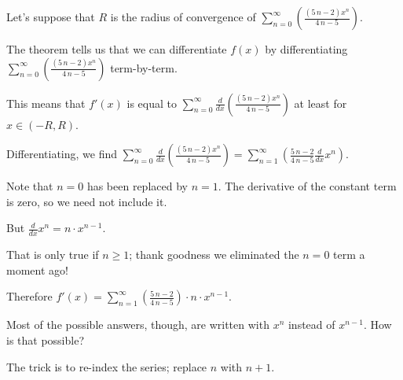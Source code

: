 \documentclass{ximera}
\begin{document}
\begin{question}
  \begin{solution}
    \begin{hint}
      Let's suppose that \(R\) is the radius of convergence of \(\displaystyle\sum_{n=0}^\infty \left( \displaystyle\frac{ {\left(5 \, n - 2\right)} x^{n} }{4 \, n - 5} \right)\).
    \end{hint}
    \begin{hint}
      The theorem tells us that we can differentiate \(f(x)\) by differentiating \(\displaystyle\sum_{n=0}^\infty \left( \displaystyle\frac{ {\left(5 \, n - 2\right)} x^{n} }{4 \, n - 5} \right)\) term-by-term.
    \end{hint}
    \begin{hint}
      This means that \(f'(x)\) is equal to \(\displaystyle\sum_{n=0}^\infty \displaystyle\frac{d}{dx} \left( \displaystyle\frac{ {\left(5 \, n - 2\right)} x^{n} }{4 \, n - 5} \right)\) at least for \(x \in (-R,R)\).
    \end{hint}
    \begin{hint}
      Differentiating, we find \(\displaystyle\sum_{n=0}^\infty \displaystyle\frac{d}{dx} \left( \displaystyle\frac{ {\left(5 \, n - 2\right)} x^{n} }{4 \, n - 5} \right) = 
      \displaystyle\sum_{n=1}^\infty \left( \displaystyle\frac{5 \, n - 2}{4 \, n - 5} \displaystyle\frac{d}{dx} x^{n} \right)\).
    \end{hint}
    \begin{hint}
      Note that \(n=0\) has been replaced by \(n=1\).  The derivative of the constant term is zero, so we need not include it.
    \end{hint}
    \begin{hint}
      But \(\displaystyle\frac{d}{dx} x^{n} = n \cdot x^{n-1}\).
    \end{hint}
    \begin{hint}
      That is only true if \(n \geq 1\); thank goodness we eliminated the \(n=0\) term a moment ago!
    \end{hint}
    \begin{hint}
      Therefore \(f'(x) = \displaystyle\sum_{n=1}^\infty \left( \displaystyle\frac{5 \, n - 2}{4 \, n - 5} \right) \cdot n \cdot x^{n-1} \).
    \end{hint}
    \begin{hint}
      Most of the possible answers, though, are written with \(x^{n}\) instead of \(x^{n-1}\).  How is that possible?
    \end{hint}
    \begin{hint}
      The trick is to re-index the series; replace \(n\) with \(n+1\).

\end{hint}
\end{solution}
\end{question}
\end{document}
